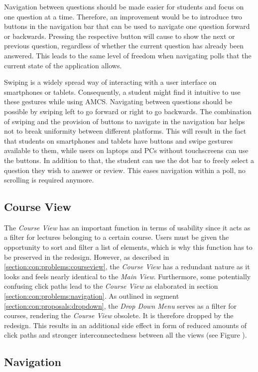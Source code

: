 Navigation between questions should be made easier for students and focus on one question at a time. Therefore, an improvement would be to introduce two buttons in the navigation bar that can be used to navigate one question forward or backwards. Pressing the respective button will cause to show the next or previous question, regardless of whether the current question has already been answered. This leads to the same level of freedom when navigating polls that the current state of the application allows.

Swiping is a widely spread way of interacting with a user interface on smartphones or tablets. Consequently, a student might find it intuitive to use these gestures while using AMCS. Navigating between questions should be possible by swiping left to go forward or right to go backwards. The combination of swiping and the provision of buttons to navigate in the navigation bar helps not to break uniformity between different platforms. This will result in the fact that students on smartphones and tablets have buttons and swipe gestures available to them, while users on laptops and PCs without touchscreens can use the buttons.
In addition to that, the student can use the dot bar to freely select a question they wish to answer or review. This eases navigation within a poll, no scrolling is required anymore.


\subsection{Course View}
The \emph{Course View} has an important function in terms of usability since it acts as a filter for lectures belonging to a certain course. Users must be given the opportunity to sort and filter a list of elements, which is why this function has to be preserved in the redesign. However, as described in \ref{section:con:problems:courseview}, the \emph{Course View} has a redundant nature as it looks and feels nearly identical to the \emph{Main View}.
Furthermore, some potentially confusing click paths lead to the \emph{Course View} as elaborated in section \ref{section:con:problems:navigation}.
As outlined in segment \ref{section:con:proposals:dropdown}, the \emph{Drop Down Menu} serves as a filter for courses, rendering the \emph{Course View} obsolete. It is therefore dropped by the redesign. This results in an additional side effect in form of reduced amounts of click paths and stronger interconnectedness between all the views (see Figure \todosct).
\subsection{Navigation}


